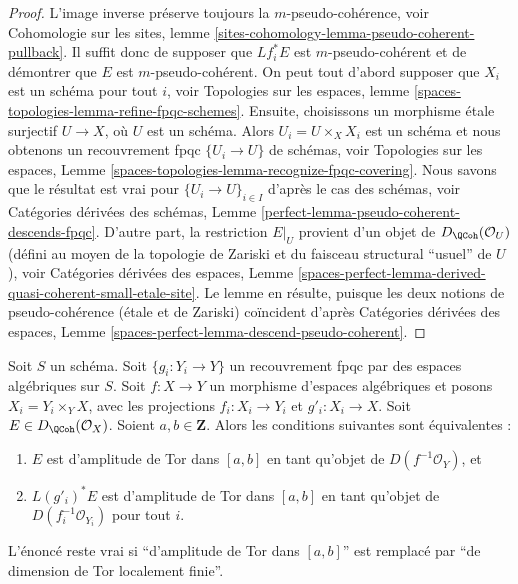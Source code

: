 \begin{proof}
L'image inverse préserve toujours la $m$-pseudo-cohérence, voir
Cohomologie sur les sites, lemme
\ref{sites-cohomology-lemma-pseudo-coherent-pullback}.
Il suffit donc de supposer que $Lf_i^*E$ est $m$-pseudo-cohérent
et de démontrer que $E$ est $m$-pseudo-cohérent.
On peut tout d'abord supposer que $X_i$ est un schéma pour tout $i$, voir
Topologies sur les espaces, lemme \ref{spaces-topologies-lemma-refine-fpqc-schemes}.
Ensuite, choisissons un morphisme \'etale surjectif $U \to X$, où $U$ est un schéma.
Alors $U_i = U \times_X X_i$ est un schéma et nous obtenons un recouvrement fpqc
$\{U_i \to U\}$ de schémas, voir
Topologies sur les espaces, Lemme
\ref{spaces-topologies-lemma-recognize-fpqc-covering}.
Nous savons que le résultat est vrai pour
$\{U_i \to U\}_{i \in I}$ d'après le cas des schémas, voir
Catégories dérivées des schémas, Lemme
\ref{perfect-lemma-pseudo-coherent-descends-fpqc}.
D'autre part, la restriction $E|_U$ provient
d'un objet de $D_\QCoh(\mathcal{O}_U)$ (défini au moyen de la topologie de Zariski
et du faisceau structural ``usuel'' de $U$), voir
Catégories dérivées des espaces, Lemme
\ref{spaces-perfect-lemma-derived-quasi-coherent-small-etale-site}.
Le lemme en résulte, puisque les deux notions de pseudo-cohérence
(\'etale et de Zariski) coïncident d'après
Catégories dérivées des espaces,
Lemme \ref{spaces-perfect-lemma-descend-pseudo-coherent}.
\end{proof}

\begin{lemma}
\label{lemma-tor-amplitude-descends-fppf}
Soit $S$ un schéma. Soit $\{g_i : Y_i \to Y\}$ un recouvrement fpqc par des
espaces algébriques sur $S$. Soit $f : X \to Y$ un morphisme d'espaces algébriques
et posons $X_i = Y_i \times_Y X$, avec les projections $f_i : X_i \to Y_i$
et $g'_i : X_i \to X$. Soit $E \in D_\QCoh(\mathcal{O}_X)$.
Soient $a, b \in \mathbf{Z}$. Alors les conditions suivantes sont équivalentes :
\begin{enumerate}
\item $E$ est d'amplitude de Tor dans $[a, b]$ en tant qu'objet de
$D(f^{-1}\mathcal{O}_Y)$, et
\item $L(g'_i)^*E$ est d'amplitude de Tor dans $[a, b]$ en tant qu'objet de
$D(f_i^{-1}\mathcal{O}_{Y_i})$ pour tout $i$.
\end{enumerate}
L'énoncé reste vrai si ``d'amplitude de Tor dans $[a, b]$'' est remplacé par
``de dimension de Tor localement finie''.
\end{lemma}

